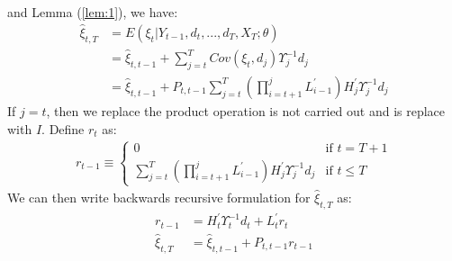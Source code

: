 \documentclass[12pt]{article}
\numberwithin{equation}{section}
\begin{document}
and Lemma (\ref{lem:1}), we have:
\begin{align*}
    \hat{\xi}_{t,T} &= E(\xi_t|Y_{t-1},d_{t},...,d_T,X_T;\theta) \\
    &= \hat{\xi}_{t,t-1} + \sum_{j=t}^{T}Cov(\xi_t,d_j)\Upsilon_j^{-1}d_j \\
    &= \hat{\xi}_{t,t-1} + P_{t,t-1}\sum_{j=t}^T\left(\prod_{i=t+1}^{j}L_{i-1}^{'}\right)H_j^{'}\Upsilon_j^{-1}d_j
\end{align*}
If $j=t$, then we replace the product operation is not carried out and is replace with $I$. Define $r_t$ as:
\begin{align*}
    r_{t-1} \equiv \begin{cases}
        0 & \text{if $t=T+1$} \\
        \sum_{j=t}^T\left(\prod_{i=t+1}^{j}L_{i-1}^{'}\right)H_j^{'}\Upsilon_j^{-1}d_j & \text{if $t\leq T$}
    \end{cases}
\end{align*}
We can then write backwards recursive formulation for $\hat{\xi}_{t,T}$ as:
\begin{align}
    r_{t-1} &= H_t^{'}\Upsilon_t^{-1}d_t + L_t^{'}r_t \\
    \hat{\xi}_{t,T} &= \hat{\xi}_{t,t-1} + P_{t,t-1}r_{t-1} \end{align}
\end{document}
